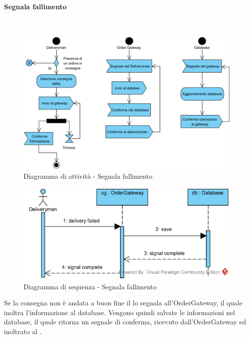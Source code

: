 \begin{samepage}
\paragraph{Segnala fallimento}\mbox{}\\
\begin{figure}[H]
	\centering
	\includegraphics[width=14cm]{diagrammi_img/attivita/delivetyman_fallimento.png}
	\caption{Diagramma di attività - Segnala fallimento}
\end{figure}
\end{samepage}
\begin{figure}[H]
	\centering
	\includegraphics[width=14cm]{../../documenti/SpecificaTecnica/diagrammi_img/sequenza/fattorino_fallimento_consegna.png}
	\caption{Diagramma di sequenza - Segnala fallimento}
\end{figure}
Se la consegna non è andata a buon fine il \Deliveryman{} lo segnala all'Order\-Gateway, il quale inoltra l'informazione al database. Vengono quindi salvate le informazioni nel database, il quale ritorna un segnale di conferma, ricevuto dall'Order\-Gateway ed inoltrato al \Deliveryman{}.

